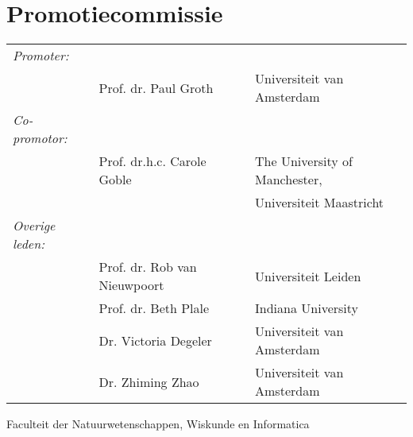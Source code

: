\newpage

\section*{Promotiecommissie}

\begin{tabular}{lll}
\textit{Promoter:}  &  & \\
     & Prof. dr. Paul Groth     & Universiteit van Amsterdam \\
\textit{Co-promotor:} & & \\     
     &  Prof. dr.h.c. Carole Goble & The University of Manchester, \\
     &                          & Universiteit Maastricht \\
\textit{Overige leden:} & & \\
     &  Prof. dr. Rob van Nieuwpoort   & Universiteit Leiden \\
     &  Prof. dr. Beth Plale     & Indiana University  \\     
     &  Dr. Victoria Degeler     & Universiteit van Amsterdam \\
     &  Dr. Zhiming Zhao         & Universiteit van Amsterdam  \\     
\end{tabular}

Faculteit der Natuurwetenschappen, Wiskunde en Informatica
